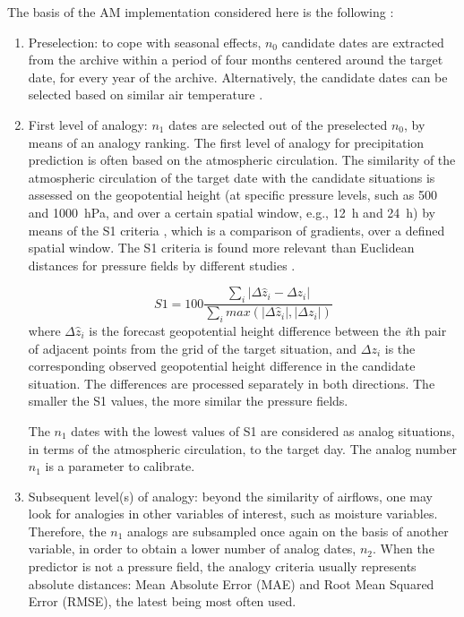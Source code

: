 \documentclass{ametsoc}
\begin{document}
The basis of the AM implementation considered here is the following \citep[same approach as][]{Guilbaud1997, Bontron2005, Marty2012, Horton2012, Radanovics2013, Chardon2014, Dayon2015, BenDaoud2016}:

\begin{enumerate}
	\item Preselection: to cope with seasonal effects, $n_{0}$ candidate dates are extracted from the archive within a period of four months centered around the target date, for every year of the archive. Alternatively, the candidate dates can be selected based on similar air temperature \citep[see][]{BenDaoud2016}.
	
	\item First level of analogy: $n_{1}$ dates are selected out of the preselected $n_{0}$, by means of an analogy ranking. The first level of analogy for precipitation prediction is often based on the atmospheric circulation. The similarity of the atmospheric circulation of the target date with the candidate situations is assessed on the geopotential height (at specific pressure levels, such as 500 and 1000~hPa, and over a certain spatial window, e.g., 12~h and 24~h) by means of the S1 criteria \citep[Eq. (\ref{eq:S1}), ][]{Teweles1954, Drosdowsky2003}, which is a comparison of gradients, over a defined spatial window. The S1 criteria is found more relevant than Euclidean distances for pressure fields by different studies \citep{Wilson1980, Woodcock1980, Guilbaud1998, Bontron2004}.
	
	\begin{equation}
	\label{eq:S1}
	S1=100 \frac {\displaystyle \sum_{i} \vert \Delta\hat{z}_{i} - \Delta z_{i} \vert}
	{\displaystyle \sum_{i} max( \vert \Delta\hat{z}_{i} \vert , \vert \Delta z_{i} \vert ) }
	\end{equation}
	where $\Delta \hat{z}_{i}$ is the forecast geopotential height difference between the \textit{i}th pair of adjacent points from the grid of the target situation, and $\Delta z_{i}$ is the corresponding observed geopotential height difference in the candidate situation. The differences are processed separately in both directions. The smaller the S1 values, the more similar the pressure fields.
	
	The $n_{1}$ dates with the lowest values of S1 are considered as analog situations, in terms of the atmospheric circulation, to the target day. The analog number $n_{1}$ is a parameter to calibrate.
	
	\item Subsequent level(s) of analogy: beyond the similarity of airflows, one may look for analogies in other variables of interest, such as moisture variables. Therefore, the $n_{1}$ analogs are subsampled once again on the basis of another variable, in order to obtain a lower number of analog dates, $n_{2}$. When the predictor is not a pressure field, the analogy criteria usually represents absolute distances: Mean Absolute Error (MAE) and Root Mean Squared Error (RMSE), the latest being most often used.
	

\end{enumerate}
\end{document}
